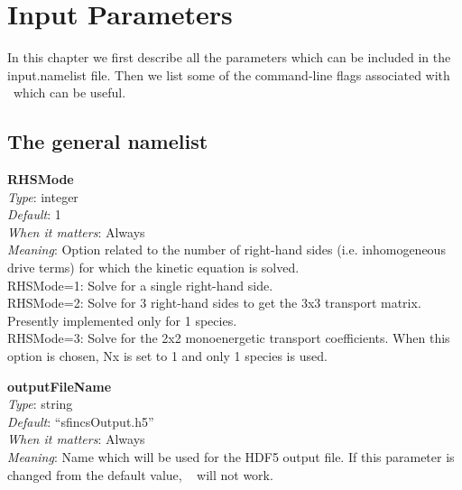 \chapter{Input Parameters}

\newcommand{\param}[5]{{\setlength{\parindent}{0cm} {\ttfamily \bfseries #1}\\{\it Type}: #2\\{\it Default}: #3\\{\it When it matters}: #4\\{\it Meaning}: #5}}
\newcommand{\ssparam}[4]{{\setlength{\parindent}{0cm} {\ttfamily \bfseries #1}\\{\it Type}: #2\\{\it When it matters}: #3\\{\it Meaning}: #4}}
\newcommand{\PETScParam}[2]{{\setlength{\parindent}{0cm} {\ttfamily \bfseries #1}\\{\it Meaning}: #2}}
\newcommand{\myhrule}{{\setlength{\parindent}{0cm} \hrulefill }}

\newcommand{\true}{{\ttfamily .true.}}
\newcommand{\false}{{\ttfamily .false.}}

In this chapter we first describe all the parameters which can be included in the {\ttfamily input.namelist} file. 
Then we list some of the command-line flags associated with \PETSc~which can be useful.




\section{The {\ttfamily general} namelist}

\param{RHSMode}
{integer}
{1}
{Always}
{Option related to the number of right-hand sides (i.e. inhomogeneous drive terms) for which the kinetic equation is solved.\\

{\ttfamily RHSMode=1}: Solve for a single right-hand side.\\

{\ttfamily RHSMode=2}: Solve for 3 right-hand sides to get the 3x3 transport matrix. Presently implemented only for 1 species.\\

{\ttfamily RHSMode=3}: Solve for the 2x2 monoenergetic transport coefficients. When this option is chosen, {\ttfamily Nx} is set to 1 and only 1 species is used.
}

\myhrule

\param{outputFileName}
{string}
{``sfincsOutput.h5''}
{Always}
{Name which will be used for the HDF5 output file.  If this parameter is changed from the default value, \sfincsScan~ will not work.}

